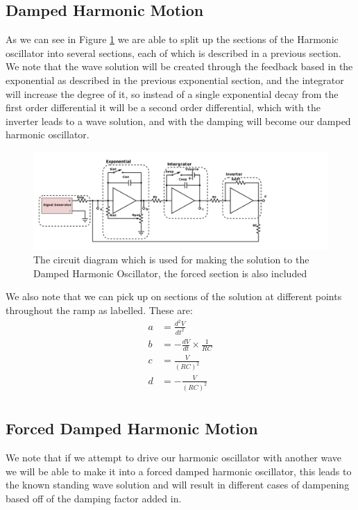 \subsection{Damped Harmonic Motion}

As we can see in Figure \ref{fig:CD_HO} we are able to split up the sections of the Harmonic oscillator into several sections, each of which is described in a previous section. We note that the wave solution will be created through the feedback based in the exponential as described in the previous exponential section, and the integrator will increase the degree of it, so instead of a single exponential decay from the first order differential it will be a second order differential, which with the inverter leads to a wave solution, and with the damping will become our damped harmonic oscillator.

\begin{figure}[ht!]
\centering
\includegraphics[scale=.43]{figures/460-17-6-Forced-HO.png}
\caption{The circuit diagram which is used for making the solution to the Damped Harmonic Oscillator, the forced section is also included}
\label{fig:CD_HO}
\end{figure}

We also note that we can pick up on sections of the solution at different points throughout the ramp as labelled. These are:
\begin{align*}
    a &= \frac{d^2 V}{dt^2} \\ 
    b &= - \frac{d V}{dt} \times \frac{1}{RC} \\ 
    c &= \frac{V}{(RC)^2} \\
    d &= - \frac{V}{(RC)^2} \\
\end{align*}

\subsection{Forced Damped Harmonic Motion}

We note that if we attempt to drive our harmonic oscillator with another wave we will be able to make it into a forced damped harmonic oscillator, this leads to the known standing wave solution and will result in different cases of dampening based off of the damping factor added in. 